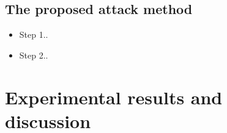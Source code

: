 \documentclass[final,3p,times]{elsarticle}
\begin{document}
\subsection{The proposed attack method}

\begin{itemize}
	\item Step 1.. 
	
	\item Step 2..
\end{itemize}

%
\section{Experimental results and discussion}
\label{sec4:Experiments}
%
%
%
%
\end{document}
